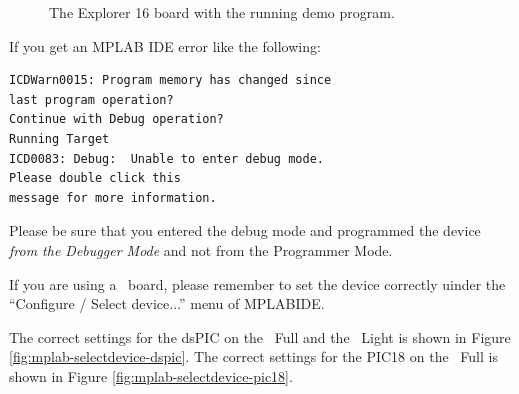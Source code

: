 \begin{figure}[htb]
\caption{The Explorer 16 board with the running demo program.}
\label{fig:explorer16running}
\end{figure}

\begin{note}
If you get an MPLAB IDE error like the following:

\begin{lstlisting}
ICDWarn0015: Program memory has changed since 
last program operation?
Continue with Debug operation?
Running Target
ICD0083: Debug:  Unable to enter debug mode.  
Please double click this
message for more information.
\end{lstlisting}

Please be sure that you entered the debug mode and programmed the device {\em from the Debugger Mode} and not from the Programmer Mode.
\end{note}

\begin{note}
If you are using a \flex\ board, please remember to set the device
correctly uinder the ``Configure / Select device...'' menu of
MPLABIDE.

The correct settings for the dsPIC on the \flex\ Full and the \flex\
Light is shown in Figure \ref{fig:mplab-selectdevice-dspic}. The
correct settings for the PIC18 on the \flex\ Full is shown in Figure
\ref{fig:mplab-selectdevice-pic18}.
\end{note}

